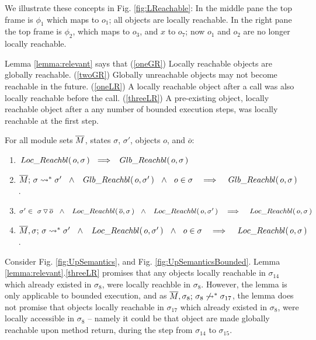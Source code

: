 We illustrate these concepts in Fig. \ref{fig:LReachable}: In the middle pane the top frame is $\phi_1$ which maps  to $o_1$; all objects are locally reachable. 
In the right pane the top frame is $\phi_2$, which maps  to $o_3$, and $x$ to $o_7$; now $o_1$ and $o_2$ are no longer locally reachable.

Lemma  \ref{lemma:relevant} %
says that  (\ref{oneGR}) Locally reachable objects are globally reachable. 
(\ref{twoGR}) 
Globally unreachable objects may not become reachable in the future.
(\ref{oneLR}) A locally reachable object  after a call was also locally reachable before the call.
(\ref{threeLR}) A pre-existing object, locally reachable  object after a any number of bounded execution steps, was locally reachable at the first step.


\begin{lemma}
\label{lemma:relevant}
For all module sets $\overline{M}$, states $\sigma$, $\sigma'$,   objects $o$, and $\overline o$:
\begin{enumerate}
\item
\label{oneGR}
$ \LRelevant o \sigma\ \ \Longrightarrow \ \   \GRelevant o \sigma$
\item
\label{twoGR}
${\leadstoOrigStar {\Mtwo}  {\sigma}  {\sigma'}} \ \ \wedge \ \  \GRelevant o {\sigma'} \ \ \wedge\ \  {o\in \sigma} \ \ \ \Longrightarrow \ \  \ \GRelevant o {\sigma}$.
\item
\label{oneLR}
{$\sigma'\in \PushS {o} {\sigma}  \ \ \wedge \ \  \LRelevant {\overline o} {\sigma} \ \ \wedge\ \   \LRelevant o {\sigma'} \ \ \ \Longrightarrow \ \ \  \LRelevant o {\sigma}$
}
\item
\label{threeLR}
${\overline{M}, \sigma;\, {\sigma} \leadsto^* \sigma'} \ \ \wedge \ \   \,Loc\_Reachbl(\,o,\sigma'\,)\  \ \wedge\ \  {o\in \sigma} \ \ \ \Longrightarrow \ \ \ \,Loc\_Reachbl(\,o,\sigma\,)$.
\end{enumerate}
\end{lemma}

{Consider Fig.  \ref{fig:UpSemantics}, and Fig.  \ref{fig:UpSemanticsBounded}.
Lemma \ref{lemma:relevant}.\ref{threeLR}  promises that any objects locally reachable in $\sigma_{14}$ which already existed in $\sigma_{8}$, were locally reachble in $\sigma_{8}$. However, the lemma is only  applicable to bounded execution, and as 
$\overline{M}, \sigma_8;\, {\sigma_8} \not\leadsto^* \sigma_{17}$, 
the lemma does not promise that  objects locally reachable in $\sigma_{17}$ which already existed in $\sigma_{8}$, were locally accessible in $\sigma_{8}$ -- namely it could be that object are made globally reachable upon method return, during the step from $\sigma_{14}$ to $\sigma_{15}$.}








